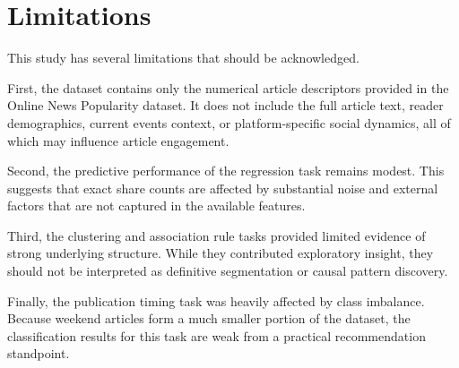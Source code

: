 \section{Limitations}

This study has several limitations that should be acknowledged.

First, the dataset contains only the numerical article descriptors provided in the Online News Popularity dataset. It does not include the full article text, reader demographics, current events context, or platform-specific social dynamics, all of which may influence article engagement.

Second, the predictive performance of the regression task remains modest. This suggests that exact share counts are affected by substantial noise and external factors that are not captured in the available features.

Third, the clustering and association rule tasks provided limited evidence of strong underlying structure. While they contributed exploratory insight, they should not be interpreted as definitive segmentation or causal pattern discovery.

Finally, the publication timing task was heavily affected by class imbalance. Because weekend articles form a much smaller portion of the dataset, the classification results for this task are weak from a practical recommendation standpoint.

